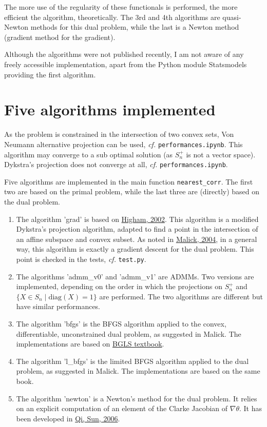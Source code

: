\documentclass{article}
\begin{document}
\medskip

The more use of the regularity of these functionals is performed, the more efficient the algorithm, theoretically. The 3rd and 4th algorithms are quasi-Newton methods for this dual problem, while the last is a Newton method (gradient method for the gradient).

\medskip

Although the algorithms were not published recently, I am not aware of any freely accessible implementation,
apart from the Python module Statsmodels providing the first algorithm.

\section{Five algorithms implemented}

As the problem is constrained in the intersection of two convex sets, Von Neumann alternative projection can be used, \emph{cf.} \texttt{performances.ipynb}. This algorithm may converge to a sub optimal solution (as $S_n^+$ is not a vector space). Dykstra's projection does not converge at all, \emph{cf.} \texttt{performances.ipynb}.

\medskip

Five algorithms are implemented in the main function \texttt{nearest\_corr}. The first two are based on the primal problem, while the last three are (directly) based on the dual problem.
\begin{enumerate}
\item The algorithm 'grad' is based on \href{https://www.maths.manchester.ac.uk/~higham/narep/narep369.pdf}{Higham, 2002}.
This algorithm is a modified Dykstra's projection algorithm, adapted to find a point in the intersection of an affine subspace and convex subset. As noted in \href{https://hal.inria.fr/inria-00072409v2/document}{Malick, 2004}, in a general way, this algorithm is exactly a gradient descent for the dual problem. This point is checked in the tests, \emph{cf.} \texttt{test.py}.
\item The algorithms 'admm\_v0' and 'admm\_v1' are ADMMs. Two versions are implemented, depending on the order in which the projections on $S_n^+$ and $\{X\in S_n \mid \mathrm{diag}(X) = 1\}$ are performed. The two algorithms are different but have similar performances.
\item The algorithm 'bfgs' is the BFGS algorithm applied to the convex, differentiable, unconstrained dual problem, as suggested in Malick. The implementations are based on \href{https://link.springer.com/book/10.1007/978-3-540-35447-5}{BGLS textbook}.
\item The algorithm 'l\_bfgs' is the limited BFGS algorithm applied to the dual problem, as suggested in Malick. The implementations are based on the same book.
\item The algorithm 'newton' is a Newton's method for the dual problem. It relies on an explicit computation of an element of the Clarke Jacobian of $\nabla \theta$. It has been developed in \href{http://www.personal.soton.ac.uk/hdqi/REPORTS/simax_06.pdf}{Qi, Sun, 2006}.
\end{enumerate}
\end{document}
